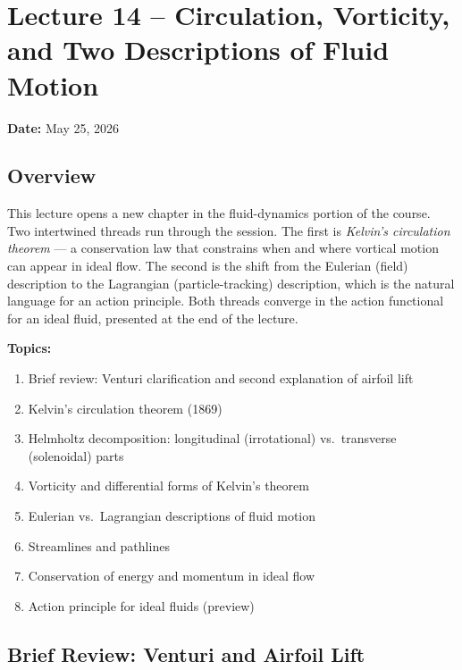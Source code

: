\documentclass[../main.tex]{subfiles}
\begin{document}
\section{Lecture 14 -- Circulation, Vorticity, and Two Descriptions of Fluid Motion}\label{sec:lec14}
\begin{center}
  \textbf{Date:} May 25, 2026
\end{center}

\subsection*{Overview}
This lecture opens a new chapter in the fluid-dynamics portion of the course. Two intertwined threads run through the session. The first is \emph{Kelvin's circulation theorem} — a conservation law that constrains when and where vortical motion can appear in ideal flow. The second is the shift from the Eulerian (field) description to the Lagrangian (particle-tracking) description, which is the natural language for an action principle. Both threads converge in the action functional for an ideal fluid, presented at the end of the lecture.

\medskip\noindent\textbf{Topics:}
\begin{enumerate}
  \item Brief review: Venturi clarification and second explanation of airfoil lift
  \item Kelvin's circulation theorem (1869)
  \item Helmholtz decomposition: longitudinal (irrotational) vs.\ transverse (solenoidal) parts
  \item Vorticity and differential forms of Kelvin's theorem
  \item Eulerian vs.\ Lagrangian descriptions of fluid motion
  \item Streamlines and pathlines
  \item Conservation of energy and momentum in ideal flow
  \item Action principle for ideal fluids (preview)
\end{enumerate}

\subsection{Brief Review: Venturi and Airfoil Lift}\label{sec:lec14:review}
\end{document}
